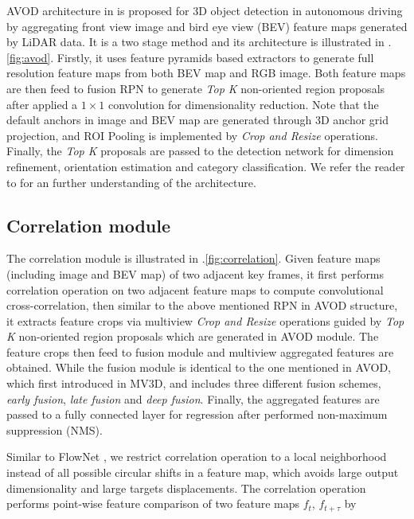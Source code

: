 \documentclass{bmvc2k}
\begin{document}
AVOD architecture in \cite{ku2018joint} is proposed for 3D object detection in autonomous driving by aggregating front view image and bird eye view (BEV) feature maps generated by LiDAR data. It is a two stage method and its architecture is illustrated in \figurename .\ref{fig:avod}. Firstly, it uses feature pyramids based extractors to generate full resolution feature maps from both BEV map and RGB image. Both feature maps are then feed to fusion RPN to generate \textit{Top K} non-oriented region proposals after applied a $1 \times 1$ convolution for dimensionality reduction. Note that the default anchors in image and BEV map are generated through 3D anchor grid projection, and ROI Pooling is implemented by \textit{Crop and Resize} operations. Finally, the \textit{Top K} proposals are passed to the detection network for dimension refinement, orientation estimation and category classification. We refer the reader to \cite{ku2018joint} for an further understanding of the architecture.

\subsection{Correlation module}
The correlation module is illustrated in \figurename .\ref{fig:correlation}. Given feature maps (including image and BEV map) of two adjacent key frames, it first performs correlation operation on two adjacent feature maps to compute convolutional cross-correlation, then similar to the above mentioned RPN in AVOD structure, it extracts feature crops via multiview \textit{Crop and Resize} operations guided by \textit{Top K} non-oriented region proposals which are generated in AVOD module. The feature crops then feed to fusion module and multiview aggregated features are obtained. While the fusion module is identical to the one mentioned in AVOD, which first introduced in MV3D\cite{chen2017multi}, and includes three different fusion schemes, \textit{early fusion}, \textit{late fusion} and \textit{deep fusion}. Finally, the aggregated features are passed to a fully connected layer for regression after performed non-maximum suppression (NMS).

Similar to FlowNet \cite{dosovitskiy2015flownet}, we restrict correlation operation to a local neighborhood instead of all possible circular shifts in a feature map, which avoids large output dimensionality and large targets displacements. The correlation operation performs point-wise feature comparison of two feature maps $f_t$, $f_{t+\tau}$ by
\end{document}
